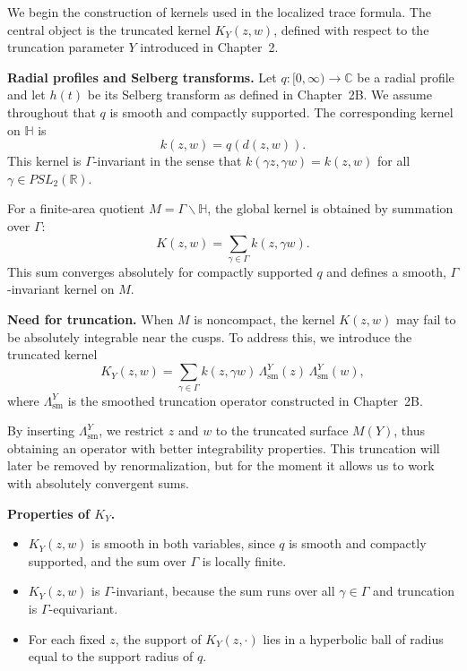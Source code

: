 
\noindent
We begin the construction of kernels used in the localized trace formula.
The central object is the truncated kernel $K_{Y}(z,w)$,
defined with respect to the truncation parameter $Y$ introduced in Chapter~2.

\medskip

\noindent\textbf{Radial profiles and Selberg transforms.}
Let $q:[0,\infty)\to \mathbb{C}$ be a radial profile
and let $h(t)$ be its Selberg transform as defined in Chapter~2B.
We assume throughout that $q$ is smooth and compactly supported.
The corresponding kernel on $\mathbb{H}$ is
\[
  k(z,w) = q(d(z,w)).
\]
This kernel is $\Gamma$-invariant in the sense that
$k(\gamma z,\gamma w)=k(z,w)$ for all $\gamma\in PSL_{2}(\mathbb{R})$.

\medskip

\noindent
For a finite-area quotient $M=\Gamma\backslash \mathbb{H}$,
the global kernel is obtained by summation over $\Gamma$:
\[
  K(z,w) = \sum_{\gamma\in\Gamma} k(z,\gamma w).
\]
This sum converges absolutely for compactly supported $q$
and defines a smooth, $\Gamma$-invariant kernel on $M$.

\medskip

\noindent\textbf{Need for truncation.}
When $M$ is noncompact,
the kernel $K(z,w)$ may fail to be absolutely integrable near the cusps.
To address this,
we introduce the truncated kernel
\[
  K_{Y}(z,w) = \sum_{\gamma\in\Gamma} k(z,\gamma w)\,\Lambda^{Y}_{\mathrm{sm}}(z)\,\Lambda^{Y}_{\mathrm{sm}}(w),
\]
where $\Lambda^{Y}_{\mathrm{sm}}$ is the smoothed truncation operator
constructed in Chapter~2B.

\medskip

\noindent
By inserting $\Lambda^{Y}_{\mathrm{sm}}$,
we restrict $z$ and $w$ to the truncated surface $M(Y)$,
thus obtaining an operator with better integrability properties.
This truncation will later be removed by renormalization,
but for the moment it allows us to work with absolutely convergent sums.

\medskip

\noindent\textbf{Properties of $K_{Y}$.}
\begin{itemize}
  \item $K_{Y}(z,w)$ is smooth in both variables,
  since $q$ is smooth and compactly supported,
  and the sum over $\Gamma$ is locally finite.
  \item $K_{Y}(z,w)$ is $\Gamma$-invariant,
  because the sum runs over all $\gamma\in\Gamma$
  and truncation is $\Gamma$-equivariant.
  \item For each fixed $z$,
  the support of $K_{Y}(z,\cdot)$ lies in a hyperbolic ball of radius equal to
  the support radius of $q$.
\end{itemize}

